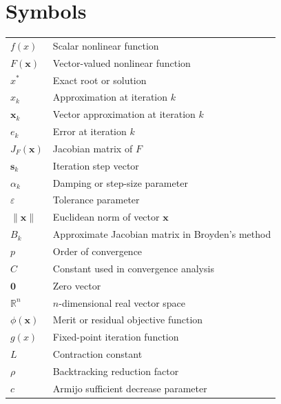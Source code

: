 \chapter*{Symbols}

\begin{tabular}{ll}
\(f(x)\) & Scalar nonlinear function \\[0.3cm]
\(F(\mathbf{x})\) & Vector-valued nonlinear function \\[0.3cm]
\(x^*\) & Exact root or solution \\[0.3cm]
\(x_k\) & Approximation at iteration \(k\) \\[0.3cm]
\(\mathbf{x}_k\) & Vector approximation at iteration \(k\) \\[0.3cm]
\(e_k\) & Error at iteration \(k\) \\[0.3cm]
\(J_F(\mathbf{x})\) & Jacobian matrix of \(F\) \\[0.3cm]
\(\mathbf{s}_k\) & Iteration step vector \\[0.3cm]
\(\alpha_k\) & Damping or step-size parameter \\[0.3cm]
\(\varepsilon\) & Tolerance parameter \\[0.3cm]
\(\|\mathbf{x}\|\) & Euclidean norm of vector \(\mathbf{x}\) \\[0.3cm]
\(B_k\) & Approximate Jacobian matrix in Broyden's method \\[0.3cm]
\(p\) & Order of convergence \\[0.3cm]
\(C\) & Constant used in convergence analysis \\[0.3cm]
\(\mathbf{0}\) & Zero vector \\[0.3cm]
\(\mathbb{R}^n\) & \(n\)-dimensional real vector space \\[0.3cm]
\(\phi(\mathbf{x})\) & Merit or residual objective function \\[0.3cm]
\(g(x)\) & Fixed-point iteration function \\[0.3cm]
\(L\) & Contraction constant \\[0.3cm]
\(\rho\) & Backtracking reduction factor \\[0.3cm]
\(c\) & Armijo sufficient decrease parameter \\[0.3cm]
\end{tabular}
\vspace{1cm}